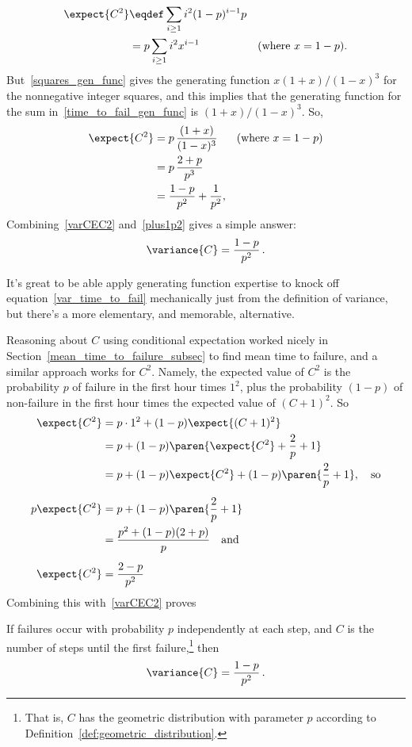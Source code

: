 \begin{align}
\expect{C^2}
   & \eqdef \sum_{i\geq 1} i^2(1-p)^{i-1}p \notag\\ %
   & = p\sum_{i\geq 1} i^2x^{i-1} & \text{(where $x=1-p$)}\label{time_to_fail_gen_func}.
\end{align}
But~\eqref{squares_gen_func} gives the generating function
$x(1+x)/(1-x)^3$ for the nonnegative integer squares, and this implies that
the generating function for the sum in~\eqref{time_to_fail_gen_func} is
$(1+x)/(1-x)^3$.  So,
\begin{align}
\expect{C^2} & = p\, \frac{(1+x)}{(1-x)^3} & \text{(where $x=1-p$)}\notag\\
             & = p\, \frac{2+p}{p^3}\notag\\
             & = \frac{1-p}{p^2} + \frac{1}{p^2}\label{plus1p2},
\end{align}
Combining~\eqref{varCEC2} and~\eqref{plus1p2} gives a simple answer:
\begin{equation}\label{var_time_to_fail}
\variance{C} = \frac{1-p}{p^2} \,.
\end{equation}

It's great to be able apply generating function expertise to knock off
equation~\eqref{var_time_to_fail} mechanically just from the definition of
variance, but there's a more elementary, and memorable, alternative.\fi

Reasoning about $C$ using conditional expectation worked nicely in
Section~\ref{mean_time_to_failure_subsec} to find mean time to
failure, and a similar approach works for $C^2$.  Namely, the expected
value of $C^2$ is the probability $p$ of failure in the first hour
times $1^2$, plus the probability $(1-p)$ of non-failure in the
first hour times the expected value of $(C+1)^2$.  So
\begin{align*}
\expect{C^2} & = p\cdot 1^2 + (1-p)\expect{(C+1)^2}\\
             & = p + (1-p) \paren{\expect{C^2} + \frac{2}{p} +1}\\
             & = p+ (1-p)\expect{C^2} + (1-p)\paren{\frac{2}{p} + 1},
                \quad\text{so}\\[5pt]
p \expect{C^2} & = p+ (1-p)\paren{\frac{2}{p} + 1}\\
               & = \frac{p^2+(1-p)(2+p)}{p} \quad\text{and}\\[5pt]
\expect{C^2} & = \frac{2 -p}{p^2} %
\end{align*}
Combining this with~\eqref{varCEC2} proves
\begin{lemma}\label{lem:var_time_to_fail}
If failures occur with probability $p$ independently at each step, and
$C$ is the number of steps until the first failure,\footnote{That is,
  $C$ has the geometric distribution with parameter $p$ according to
  Definition~\ref{def:geometric_distribution}.} then
\begin{equation}\label{var_time_to_fail}
\variance{C} = \frac{1-p}{p^2} \,.
\end{equation}
\end{lemma}

